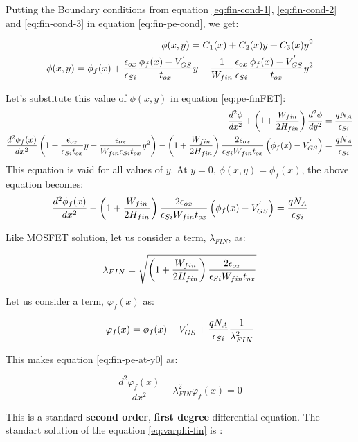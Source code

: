 \documentclass[a4paper]{article}
\begin{document}
Putting the Boundary conditions from equation \ref{eq:fin-cond-1}, \ref{eq:fin-cond-2} and \ref{eq:fin-cond-3} in equation \ref{eq:fin-pe-cond}, we get:

\begin{align*}
  \phi(x,y) = C_1(x) + C_2(x)y  + C_3(x)y^2\\
  \phi(x,y) = \phi_f(x) + \frac {\epsilon_{ox}} {\epsilon_{Si}} \frac{\phi_f(x) - V_{GS}^{'}}{t_{ox}} y -  \frac{1}{W_{fin}} \frac {\epsilon_{ox}} {\epsilon_{Si}} \frac{\phi_f(x) - V_{GS}^{'}}{t_{ox}} y^2
\end{align*}

Let's substitute this value of $\phi(x,y)$ in equation \ref{eq:pe-finFET}:
\begin{align*}
    \frac {d^2\phi} {dx^2} + \left( 1 + \frac{W_{fin}} {2 H_{fin}} \right) \frac {d^2\phi} {dy^2} = \frac{qN_A} {\epsilon_{Si}}\\
    \frac{d^2\phi_f(x)}{dx^2} \left(1 + \frac{\epsilon_{ox}}{\epsilon_{Si}t_{ox}}y - \frac{\epsilon_{ox}}{W_{fin} \epsilon_{Si}t_{ox}}y^2\right) - \left( 1 + \frac{W_{fin}}{2 H_{fin}} \right) \frac{2 \epsilon_{ox}}{\epsilon_{Si}W_{fin} t_{ox}}\left( \phi_f(x) - V_{GS}^{'}\right) = \frac{qN_A} {\epsilon_{Si}}
\end{align*}
This equation is vaid for all values of $y$. At $y=0$, $\phi(x,y)=\phi_f(x)$, the above equation becomes:
\begin{equation}
  \label{eq:fin-pe-at-y0}
  \frac{d^2\phi_f(x)}{dx^2} - \left( 1 + \frac{W_{fin}}{2 H_{fin}} \right) \frac{2 \epsilon_{ox}}{\epsilon_{Si}W_{fin} t_{ox}}\left( \phi_f(x) - V_{GS}^{'}\right) = \frac{qN_A} {\epsilon_{Si}}
\end{equation}

Like MOSFET solution, let us consider a term, $\lambda_{FIN}$, as:

\begin{equation}
  \lambda_{FIN} = \sqrt {\left( 1 + \frac{W_{fin}}{2 H_{fin}} \right) \frac{2 \epsilon_{ox}}{\epsilon_{Si}W_{fin} t_{ox}}}
\end{equation}

Let us consider a term, $\varphi_f(x)$ as:

\begin{equation}
  \varphi_f(x) = \phi_f(x) - V_{GS}^{'} + \frac{qN_A} {\epsilon_{Si}} \frac{1}{\lambda_{FIN}^2}
\end{equation}

This makes equation \ref{eq:fin-pe-at-y0} as:

\begin{equation}
  \label{eq:varphi-fin}
  \frac{d^2\varphi_f(x)}{dx^2} - \lambda_{FIN}^2\varphi_f(x) = 0
\end{equation}

This is a standard \textbf{second order}, \textbf{first degree} differential equation. The standart solution of the equation \ref{eq:varphi-fin} is :
\end{document}
